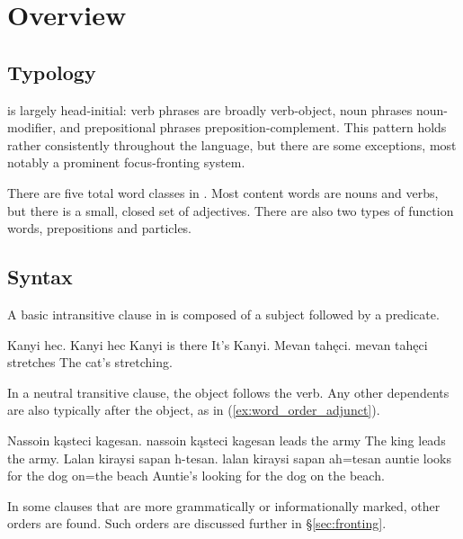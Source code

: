 \chapter{Overview}
\section{Typology}
\langname{} is largely head-initial: verb phrases are broadly verb-object, noun phrases noun-modifier, and prepositional phrases preposition-complement. This pattern holds rather consistently throughout the language, but there are some exceptions, most notably a prominent focus-fronting system.

There are five total word classes in \langname{}. Most content words are nouns and verbs, but there is a small, closed set of adjectives. There are also two types of function words, prepositions and particles.

\section{Syntax}
A basic intransitive clause in \langname{} is composed of a subject followed by a predicate.  

\begin{examples}
    \ex
        \script Kanyi hec.
        \bits Kanyi hec
        \gloss Kanyi {is there}
        \tr It's Kanyi.
    \ex
        \script Mevan tahęci.
        \bits mevan tahęci
         stretches
        \tr The cat's stretching.
\end{examples}

In a neutral transitive clause, the object follows the verb. Any other dependents are also typically after the object, as in (\ref{ex:word_order_adjunct}).

\begin{examples}
    \ex
        \script Nassoin kąsteci kagesan.
        \bits nassoin kąsteci kagesan
         leads {the army}
        \tr The king leads the army.
    \ex \label{ex:word_order_adjunct}
        \script Lalan kiraysi sapan h-tesan.
        \bits lalan kiraysi sapan ah=tesan
        \gloss auntie {looks for} {the dog} on={the beach}
        \tr Auntie's looking for the dog on the beach.
\end{examples}

In some clauses that are more grammatically or informationally marked, other orders are found. Such orders are discussed further in §\ref{sec:fronting}.

